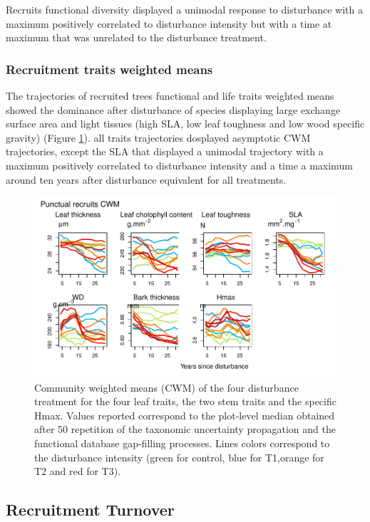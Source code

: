 \documentclass[fleqn,10pt]{ArtEcoFoG} %
\begin{document}
Recruits functional diversity displayed a unimodal response to
disturbance with a maximum positively correlated to disturbance
intensity but with a time at maximum that was unrelated to the
disturbance treatment.

\subsubsection{Recruitment traits weighted
means}\label{recruitment-traits-weighted-means}

The trajectories of recruited trees functional and life traits weighted
means showed the dominance after disturbance of species displaying large
exchange surface area and light tissues (high SLA, low leaf toughness
and low wood specific gravity) (Figure \ref{fig:Fig5}). all traits
trajectories dosplayed asymptotic CWM trajectories, except the SLA that
displayed a unimodal trajectory with a maximum positively correlated to
disturbance intensity and a time a maximum around ten years after
disturbance equivalent for all treatments.

\begin{figure}

{\centering \includegraphics[width=0.8\linewidth]{RecruitmentTrajectories_files/figure-latex/Fig5-1} 

}

\caption{Community weighted means (CWM) of the four disturbance treatment for the four leaf traits, the two stem traits  and the specific Hmax. Values reported correspond to the plot-level median obtained after 50 repetition of the taxonomic uncertainty propagation and the functional database gap-filling processes. Lines colors correspond to the disturbance intensity (green for control, blue for T1,orange for T2 and red for T3).}\label{fig:Fig5}
\end{figure}

\subsection{Recruitment Turnover}\label{recruitment-turnover}
\end{document}
